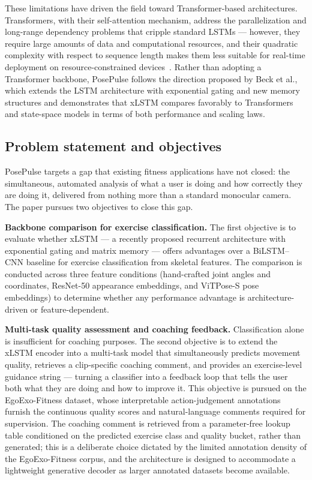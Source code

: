 \documentclass[conference,onecolumn,oneside]{IEEEtran}
\begin{document}
These limitations have driven the field toward Transformer-based architectures. Transformers, with their self-attention mechanism, address the parallelization and long-range dependency problems that cripple standard LSTMs --- however, they require large amounts of data and computational resources, and their quadratic complexity with respect to sequence length makes them less suitable for real-time deployment on resource-constrained devices~\cite{4}.  Rather than adopting a Transformer backbone, PosePulse follows the direction proposed by Beck et al.\cite{4}, which extends the LSTM architecture with exponential gating and new memory structures and demonstrates that xLSTM compares favorably to Transformers and state-space models in terms of both performance and scaling laws.\cite{4}

\vspace{0.5cm}
\subsection{Problem statement and objectives}
\vspace{0.5cm}
PosePulse targets a gap that existing fitness applications have not
closed: the simultaneous, automated analysis of what a user is doing
and how correctly they are doing it, delivered from nothing more than
a standard monocular camera. The paper pursues two objectives to close
this gap.

\textbf{Backbone comparison for exercise classification.}
The first objective is to evaluate whether xLSTM --- a recently
proposed recurrent architecture with exponential gating and matrix
memory --- offers advantages over a BiLSTM--CNN baseline for exercise
classification from skeletal features. The comparison is conducted
across three feature conditions (hand-crafted joint angles and
coordinates, ResNet-50 appearance embeddings, and ViTPose-S pose
embeddings) to determine whether any performance advantage is
architecture-driven or feature-dependent.

\textbf{Multi-task quality assessment and coaching feedback.}
Classification alone is insufficient for coaching purposes. The second
objective is to extend the xLSTM encoder into a multi-task model that
simultaneously predicts movement quality, retrieves a clip-specific
coaching comment, and provides an exercise-level guidance string ---
turning a classifier into a feedback loop that tells the user both
what they are doing and how to improve it. This objective is pursued
on the EgoExo-Fitness dataset, whose interpretable action-judgement
annotations furnish the continuous quality scores and natural-language
comments required for supervision. The coaching comment is retrieved
from a parameter-free lookup table conditioned on the predicted
exercise class and quality bucket, rather than generated; this is a
deliberate choice dictated by the limited annotation density of the
EgoExo-Fitness corpus, and the architecture is designed to accommodate
a lightweight generative decoder as larger annotated datasets become
available.
\end{document}
